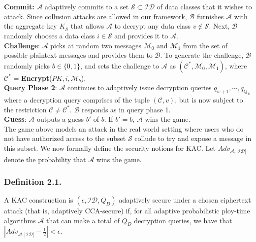 \noindent\textbf{Commit:} $\mathcal{A}$ adaptively commits to a set $\mathcal{S} \subset \mathcal{ID}$ of data classes that it wishes to attack. Since collusion attacks are allowed in our framework, $\mathcal{B}$ furnishes $\mathcal{A}$ with the aggregate key $K_{\overline{\mathcal{S}}}$ that allows $\mathcal{A}$ to decrypt any data class $v\notin\mathcal{S}$. Next, $\mathcal{B}$ randomly chooses a data class $i\in\mathcal{S}$ and provides it to $\mathcal{A}$.\\ 
 
\noindent\textbf{Challenge}: $\mathcal{A}$ picks at random two messages $\mathcal{M}_0$ and $\mathcal{M}_1$ from the set of possible plaintext messages and provides them to $\mathcal{B}$. To generate the challenge, $\mathcal{B}$ randomly picks $b\in\{0,1\}$, and sets the challenge to $\mathcal{A}$ as $(\mathcal{C}^{*},\mathcal{M}_0,\mathcal{M}_1)$, where ${\mathcal{C}}^{*}$ = \textbf{Encrypt}($PK,i,\mathcal{M}_b$).\\
 
\noindent\textbf{Query Phase 2}: $\mathcal{A}$ continues to adaptively issue decryption queries $q_{w+1},\cdots,q_{Q_D}$ where a decryption query comprises of the tuple $(\mathcal{C},v)$, but is now subject to the restriction $\mathcal{C}\neq {\mathcal{C}}^{*}$. $\mathcal{B}$ responds as in query phase 1.\\ 
 
 
\noindent\textbf{Guess}: $\mathcal{A}$ outputs a guess $b'$ of $b$. If $b' = b$, $\mathcal{A}$ wins the game.\\


\noindent The game above models an attack in the real world setting where users who do not have authorized access to the subset $\mathcal{S}$ collude to try and expose a message in this subset. We now formally define the security notions for KAC. Let $Adv_{\mathcal{A},|\mathcal{ID}|}$ denote the probability that $\mathcal{A}$ wins the game.
\subsubsection{Definition 2.1.}
 A KAC construction is $(\epsilon,\mathcal{ID},Q_D)$ adaptively secure under a chosen ciphertext attack (that is, adaptively CCA-secure) if, for all adaptive probabilistic ploy-time algorithms $\mathcal{A}$ that can make a total of $Q_D$ decryption queries, we have that $|Adv_{\mathcal{A},|\mathcal{ID}|}-\frac{1}{2}| < \epsilon$.
 
